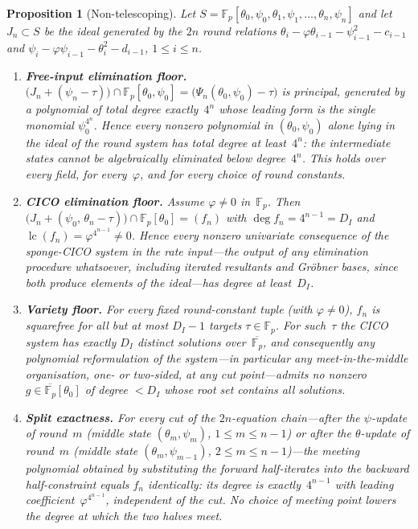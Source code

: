 \documentclass[11pt,a4paper]{article}
\newtheorem{proposition}[theorem]{Proposition}
\theoremstyle{definition}
\newcommand{\Fp}{\mathbb{F}_p}
\begin{document}
\begin{proposition}[Non-telescoping]\label{prop:nontelescoping}
Let
$S = \Fp[\theta_0, \psi_0, \theta_1, \psi_1, \ldots, \theta_n, \psi_n]$
and let $J_n \subset S$ be the ideal generated by the $2n$ round
relations $\theta_i - \varphi \theta_{i-1} - \psi_{i-1}^2 - c_{i-1}$
and $\psi_i - \varphi \psi_{i-1} - \theta_i^2 - d_{i-1}$,
$1 \le i \le n$.
\begin{enumerate}[nosep, label=(\roman*)]
\item \textbf{Free-input elimination floor.}
$\bigl(J_n + (\psi_n - \tau)\bigr) \cap \Fp[\theta_0, \psi_0]
 = \bigl(\Psi_n(\theta_0, \psi_0) - \tau\bigr)$ is principal,
generated by a polynomial of total degree exactly~$4^{n}$ whose
leading form is the single monomial $\psi_0^{4^{n}}$. Hence every
nonzero polynomial in $(\theta_0, \psi_0)$ alone lying in the ideal of
the round system has total degree at least~$4^{n}$: the intermediate
states cannot be algebraically eliminated below degree~$4^n$. This
holds over every field, for every~$\varphi$, and for every choice of
round constants.
\item \textbf{CICO elimination floor.} Assume $\varphi \ne 0$
in~$\Fp$. Then
$\bigl(J_n + (\psi_0,\, \theta_n - \tau)\bigr) \cap \Fp[\theta_0]
 = (f_n)$ with $\deg f_n = 4^{n-1} = D_I$ and
$\operatorname{lc}(f_n) = \varphi^{4^{n-1}} \ne 0$. Hence every
nonzero univariate consequence of the sponge-CICO system in the rate
input---the output of any elimination procedure whatsoever, including
iterated resultants and Gr\"obner bases, since both produce elements
of the ideal---has degree at least~$D_I$.
\item \textbf{Variety floor.} For every fixed round-constant tuple
(with $\varphi \ne 0$), $f_n$ is squarefree for all but at most
$D_I - 1$ targets $\tau \in \Fp$. For such~$\tau$ the CICO system has
exactly $D_I$ distinct solutions over~$\overline{\Fp}$, and
consequently \emph{any} polynomial reformulation of the system---in
particular any meet-in-the-middle organisation, one- or two-sided, at
any cut point---admits no nonzero $g \in \overline{\Fp}[\theta_0]$ of
degree $< D_I$ whose root set contains all solutions.
\item \textbf{Split exactness.} For every cut of the $2n$-equation
chain---after the $\psi$-update of round~$m$ (middle state
$(\theta_m, \psi_m)$, $1 \le m \le n-1$) or after the $\theta$-update
of round~$m$ (middle state $(\theta_m, \psi_{m-1})$,
$2 \le m \le n-1$)---the meeting polynomial obtained by substituting
the forward half-iterates into the backward half-constraint equals
$f_n$ identically: its degree is exactly~$4^{n-1}$ with leading
coefficient~$\varphi^{4^{n-1}}$, independent of the cut. No choice of
meeting point lowers the degree at which the two halves meet.
\end{enumerate}
\end{proposition}
\end{document}
